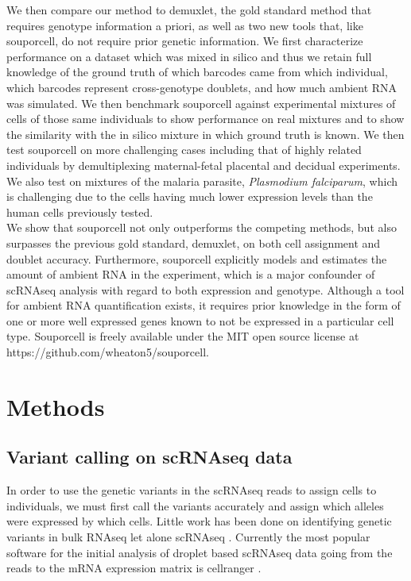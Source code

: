 We then compare our method to demuxlet, the gold standard method that requires genotype information a priori, as well as two new tools that, like souporcell, do not require prior genetic information\cite{vireo}\cite{scsplit}. We first characterize performance on a dataset which was mixed in silico and thus we retain full knowledge of the ground truth of which barcodes came from which individual, which barcodes represent cross-genotype doublets, and how much ambient RNA was simulated. We then benchmark souporcell against experimental mixtures of cells of those same individuals to show performance on real mixtures and to show the similarity with the in silico mixture in which ground truth is known. We then test souporcell on more challenging cases including that of highly related individuals by demultiplexing maternal-fetal placental and decidual experiments. We also test on mixtures of the malaria parasite, \textit{Plasmodium falciparum}, which is challenging due to the cells having much lower expression levels than the human cells previously tested.
\\
We show that souporcell not only outperforms the competing methods, but also surpasses the previous gold standard, demuxlet, on both cell assignment and doublet accuracy. Furthermore, souporcell explicitly models and estimates the amount of ambient RNA in the experiment, which is a major confounder of scRNAseq analysis with regard to both expression and genotype. Although a tool for ambient RNA quantification exists\cite{soupx}, it requires prior knowledge in the form of one or more well expressed genes known to not be expressed in a particular cell type. Souporcell is freely available under the MIT open source license at https://github.com/wheaton5/souporcell.



\section{Methods} %
\subsection{Variant calling on scRNAseq data}
In order to use the genetic variants in the scRNAseq reads to assign cells to individuals, we must first call the variants accurately and assign which alleles were expressed by which cells. Little work has been done on identifying genetic variants in bulk RNAseq \cite{RNAvariant} let alone scRNAseq \cite{vartrix}\cite{cellsnp}. 
Currently the most popular software for the initial analysis of droplet based scRNAseq data going from the reads to the mRNA expression matrix is cellranger \cite{10xsinglecell}. 


